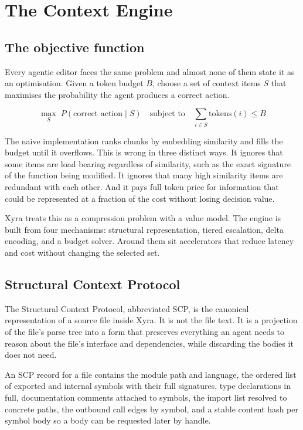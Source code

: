 \chapter{The Context Engine}
\label{ch:context}

\section{The objective function}

Every agentic editor faces the same problem and almost none of them state it as an
optimisation. Given a token budget $B$, choose a set of context items $S$ that maximises the
probability the agent produces a correct action.

\[
\max_{S} \; P(\text{correct action} \mid S) \quad \text{subject to} \quad \sum_{i \in S} \text{tokens}(i) \le B
\]

The naive implementation ranks chunks by embedding similarity and fills the budget until it
overflows. This is wrong in three distinct ways. It ignores that some items are load bearing
regardless of similarity, such as the exact signature of the function being modified. It
ignores that many high similarity items are redundant with each other. And it pays full
token price for information that could be represented at a fraction of the cost without
losing decision value.

Xyra treats this as a compression problem with a value model. The engine is built from four
mechanisms: structural representation, tiered escalation, delta encoding, and a budget
solver. Around them sit accelerators that reduce latency and cost without changing the
selected set.

\section{Structural Context Protocol}

The Structural Context Protocol, abbreviated SCP, is the canonical representation of a source
file inside Xyra. It is not the file text. It is a projection of the file's parse tree into a
form that preserves everything an agent needs to reason about the file's interface and
dependencies, while discarding the bodies it does not need.

An SCP record for a file contains the module path and language, the ordered list of exported
and internal symbols with their full signatures, type declarations in full, documentation
comments attached to symbols, the import list resolved to concrete paths, the outbound call
edges by symbol, and a stable content hash per symbol body so a body can be requested later
by handle.

